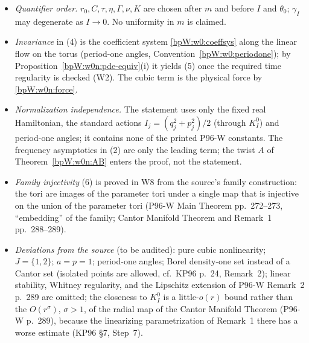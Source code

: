 \begin{remark}\label{bpW:wh:reading}
\begin{itemize}
\item \emph{Quantifier order.} $r_0,C,\tau,\eta,\Gamma,\nu,K$ are chosen after $m$ and before $I$ and $\theta_0$;
  $\gamma_I$ may degenerate as $I\to0$. No uniformity in $m$ is claimed.
\item \emph{Invariance} in (4) is the coefficient system \eqref{bpW:w0:coeffsys} along the linear flow on the torus
  (period-one angles, Convention~\ref{bpW:w0:periodone}); by Proposition~\ref{bpW:w0n:pde-equiv}(i) it yields (5)
  once the required time regularity is checked (W2). The cubic term is the physical force by
  \eqref{bpW:w0n:force}.
\item \emph{Normalization independence.} The statement uses only the fixed real Hamiltonian, the standard actions
  $I_j=(q_j^2+p_j^2)/2$ (through $K^0_I$) and period-one angles; it contains none of the printed P96-W constants.
  The frequency asymptotics in (2) are only the leading term; the twist $A$ of Theorem~\ref{bpW:w0n:AB} enters the
  proof, not the statement.
\item \emph{Family injectivity} (6) is proved in W8 from the source's family construction: the tori are images of
  the parameter tori under a single map that is injective on the union of the parameter tori (P96-W Main Theorem
  pp.~272--273, ``embedding'' of the family; Cantor Manifold Theorem and Remark~1 pp.~288--289).
\item \emph{Deviations from the source} (to be audited): pure cubic nonlinearity; $J=\{1,2\}$; $a=p=1$; period-one
  angles; Borel density-one set instead of a Cantor set (isolated points are allowed, cf.\ KP96 p.~24, Remark~2);
  linear stability, Whitney regularity, and the Lipschitz extension of P96-W Remark~2 p.~289 are omitted; the
  closeness to $K^0_I$ is a little-$o(r)$ bound rather than the $O(r^\sigma)$, $\sigma>1$, of the radial map of the
  Cantor Manifold Theorem (P96-W p.~289), because the linearizing parametrization of Remark~1 there has a worse
  estimate (KP96 \S7, Step~7).
\end{itemize}
\end{remark}

